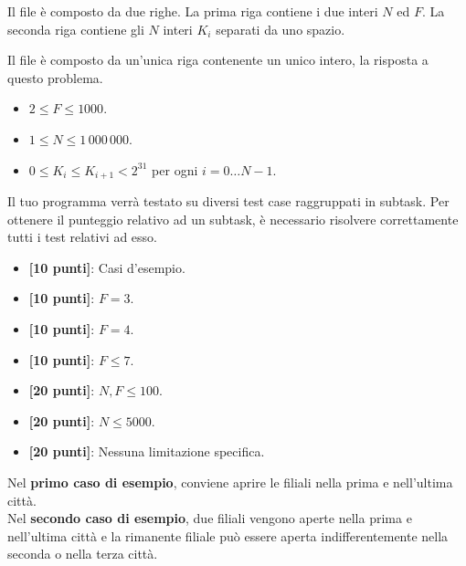 \InputFile
Il file  è composto da due righe. La prima riga contiene i due interi $N$ ed $F$. La seconda riga contiene gli $N$ interi $K_i$ separati da uno spazio.

\OutputFile
Il file \outputfile{} è composto da un'unica riga contenente un unico intero, la risposta a questo problema.

\Constraints
\begin{itemize}[nolistsep, itemsep=2mm]
	\item $2 \le F \le 1000$.
	\item $1 \le N \le 1\,000\,000$.
	\item $0 \le K_i \le K_{i+1} < 2^{31}$ per ogni $i=0\ldots N-1$.
\end{itemize}

\Scoring
Il tuo programma verrà testato su diversi test case raggruppati in subtask.
Per ottenere il punteggio relativo ad un subtask, è necessario risolvere
correttamente tutti i test relativi ad esso.

\begin{itemize}[nolistsep,itemsep=2mm]
  \item \textbf{ [10 punti]}: Casi d'esempio.
  \item \textbf{ [10 punti]}: $F = 3$.
  \item \textbf{ [10 punti]}: $F = 4$.
  \item \textbf{ [10 punti]}: $F \le 7$.
  \item \textbf{ [20 punti]}: $N, F \leq 100$.
  \item \textbf{ [20 punti]}: $N \leq 5000$.
  \item \textbf{ [20 punti]}: Nessuna limitazione specifica.
\end{itemize}



\Examples
\begin{example}
%
%
\end{example}


\Explanation
Nel \textbf{primo caso di esempio}, conviene aprire le filiali nella prima e nell'ultima citt\`a.\\[2mm]
Nel \textbf{secondo caso di esempio}, due filiali vengono aperte nella prima e nell'ultima citt\`a e la rimanente filiale pu\`o essere aperta indifferentemente nella seconda o nella terza citt\`a.
